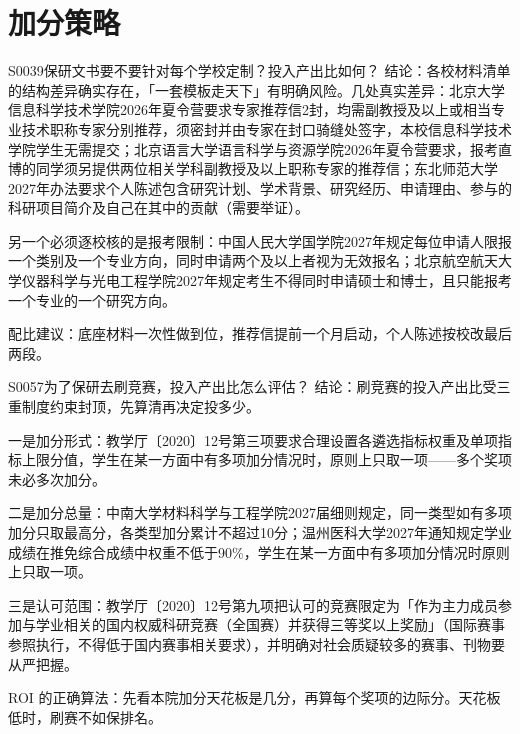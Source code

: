 \section{加分策略}
\begin{qa}{S0039}{保研文书要不要针对每个学校定制？投入产出比如何？}
结论：各校材料清单的结构差异确实存在，「一套模板走天下」有明确风险。几处真实差异：北京大学信息科学技术学院2026年夏令营要求专家推荐信2封，均需副教授及以上或相当专业技术职称专家分别推荐，须密封并由专家在封口骑缝处签字，本校信息科学技术学院学生无需提交；北京语言大学语言科学与资源学院2026年夏令营要求，报考直博的同学须另提供两位相关学科副教授及以上职称专家的推荐信；东北师范大学2027年办法要求个人陈述包含研究计划、学术背景、研究经历、申请理由、参与的科研项目简介及自己在其中的贡献（需要举证）。

另一个必须逐校核的是报考限制：中国人民大学国学院2027年规定每位申请人限报一个类别及一个专业方向，同时申请两个及以上者视为无效报名；北京航空航天大学仪器科学与光电工程学院2027年规定考生不得同时申请硕士和博士，且只能报考一个专业的一个研究方向。

配比建议：底座材料一次性做到位，推荐信提前一个月启动，个人陈述按校改最后两段。
\end{qa}

\begin{qa}{S0057}{为了保研去刷竞赛，投入产出比怎么评估？}
结论：刷竞赛的投入产出比受三重制度约束封顶，先算清再决定投多少。

一是加分形式：教学厅〔2020〕12号第三项要求合理设置各遴选指标权重及单项指标上限分值，学生在某一方面中有多项加分情况时，原则上只取一项——多个奖项未必多次加分。

二是加分总量：中南大学材料科学与工程学院2027届细则规定，同一类型如有多项加分只取最高分，各类型加分累计不超过10分；温州医科大学2027年通知规定学业成绩在推免综合成绩中权重不低于90\%，学生在某一方面中有多项加分情况时原则上只取一项。

三是认可范围：教学厅〔2020〕12号第九项把认可的竞赛限定为「作为主力成员参加与学业相关的国内权威科研竞赛（全国赛）并获得三等奖以上奖励」（国际赛事参照执行，不得低于国内赛事相关要求），并明确对社会质疑较多的赛事、刊物要从严把握。

ROI 的正确算法：先看本院加分天花板是几分，再算每个奖项的边际分。天花板低时，刷赛不如保排名。
\end{qa}

